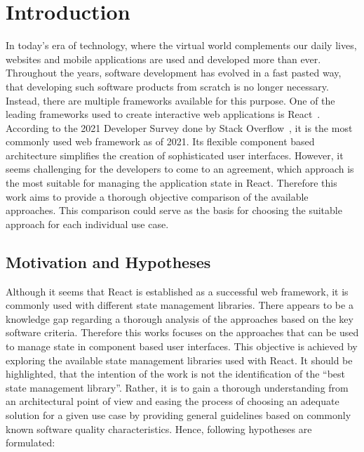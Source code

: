 
\clearpage
\hypertarget{introduction}{
\chapter{Introduction}\label{introduction}}

In today's era of technology, where the virtual world complements our daily lives,
websites and mobile applications are used and developed
more than ever. Throughout the years, software development has evolved
in a fast pasted way, that developing such software products from
scratch is no longer necessary. Instead, there are multiple frameworks
available for this purpose. One of the leading frameworks used to create
interactive web applications is React~\cite{react}. According to the 2021 Developer
Survey done by Stack Overflow~\cite{stackoverflow_insights},
it is the most commonly used web framework as of 2021. Its flexible
component based architecture simplifies the creation of sophisticated
user interfaces. However, it seems challenging for the developers to
come to an agreement, which approach is the most suitable for managing
the application state in React. Therefore this work aims to provide a
thorough objective comparison of the available approaches. This
comparison could serve as the basis for choosing the suitable approach
for each individual use case.

\clearpage
\hypertarget{motivation-and-hypotheses}{%
\section{Motivation and Hypotheses}\label{motivation-and-hypotheses}}

Although it seems that React is established as a successful web
framework, it is commonly used with different state management
libraries. There appears to be a knowledge gap regarding a thorough
analysis of the approaches based on the key software criteria. Therefore
this works focuses on the approaches that can be used to manage state in
component based user interfaces. This objective is achieved by exploring
the available state management libraries used with React. It should be
highlighted, that the intention of the work is not the identification of
the ``best state management library''. Rather, it is to gain a thorough
understanding from an architectural point of view and easing the process
of choosing an adequate solution for a given use case by providing
general guidelines based on commonly known software quality
characteristics. Hence, following hypotheses are formulated:

